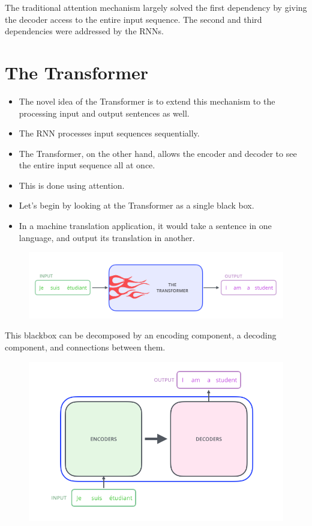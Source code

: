 The traditional attention mechanism largely solved the first dependency by giving the decoder access to the entire input sequence. The second and third dependencies were addressed by the RNNs.


\section{The Transformer}
\begin{itemize}
 \item The novel idea of the Transformer is to extend this mechanism to the processing input and output sentences as well.
 \item The RNN processes input sequences sequentially. 
 \item The Transformer, on the other hand, allows the encoder and decoder to see the entire input sequence all at once.
 \item This is done using attention.
  \item Let’s begin by looking at the Transformer as a single black box. 
  \item In a machine translation application, it would take a sentence in one language, and output its translation in another.
 \end{itemize}
     \begin{figure}[h]
        	\includegraphics[scale = 0.29]{pics/the_transformer_3.png}
        \end{figure}  



This blackbox can be decomposed by an encoding component, a decoding component, and connections between them.

     \begin{figure}[h]
        	\includegraphics[scale = 0.29]{pics/The_transformer_encoders_decoders.png}
        \end{figure}  

